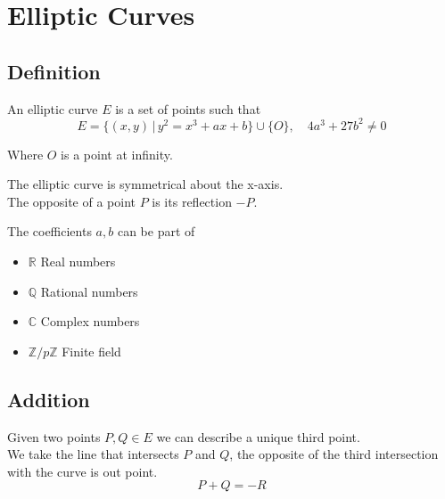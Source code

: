 \documentclass[a4paper]{article}
\author{Paolo Bettelini}
\date{}
\begin{document}
\maketitle
\tableofcontents
\pagebreak

\section{Elliptic Curves}

\subsection{Definition}

An elliptic curve \(E\) is a set of points such that
\[
	E=\{(x,y)\,|\,y^2=x^3+ax+b\}\cup\{O\},\quad 4a^3+27b^2\neq 0
\]

\begin{center}
\end{center}
Where \(O\) is a point at infinity.

The elliptic curve is symmetrical about the x-axis.\\
The opposite of a point \(P\) is its reflection \(-P\).

The coefficients \(a,b\) can be part of
\begin{itemize}
	\item \(\mathbb{R}\) Real numbers
	\item \(\mathbb{Q}\) Rational numbers
	\item \(\mathbb{C}\) Complex numbers
	\item \(\mathbb{Z}/p\mathbb{Z}\) Finite field
\end{itemize}

\subsection{Addition}

Given two points \(P,Q\in E\) we can describe a unique third point.\\
We take the line that intersects \(P\) and \(Q\), the opposite of the third intersection with the curve is out point.
\[
	P+Q=-R
\]
\end{document}
